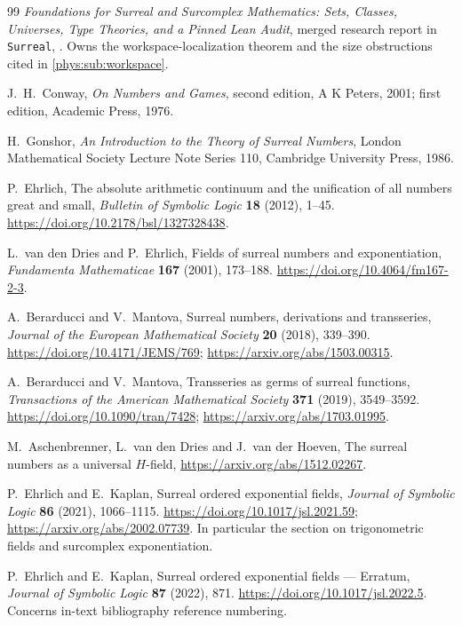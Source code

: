 \documentclass[11pt,letterpaper]{article}
\numberwithin{equation}{section}
\theoremstyle{definition}
\theoremstyle{remark}
\begin{document}
\begin{thebibliography}{99}
\emph{Foundations for Surreal and Surcomplex Mathematics: Sets, Classes,
Universes, Type Theories, and a Pinned Lean Audit}, merged research report in
\texttt{Surreal}, .
Owns the workspace-localization theorem and the size obstructions cited in
\cref{phys:sub:workspace}.

J.~H.~Conway, \emph{On Numbers and Games}, second edition, A K Peters, 2001;
first edition, Academic Press, 1976.

H.~Gonshor, \emph{An Introduction to the Theory of Surreal Numbers}, London
Mathematical Society Lecture Note Series 110, Cambridge University Press, 1986.

P.~Ehrlich, The absolute arithmetic continuum and the unification of all
numbers great and small, \emph{Bulletin of Symbolic Logic} \textbf{18} (2012),
1--45. \url{https://doi.org/10.2178/bsl/1327328438}.

L.~van den Dries and P.~Ehrlich, Fields of surreal numbers and exponentiation,
\emph{Fundamenta Mathematicae} \textbf{167} (2001), 173--188.
\url{https://doi.org/10.4064/fm167-2-3}.

A.~Berarducci and V.~Mantova, Surreal numbers, derivations and transseries,
\emph{Journal of the European Mathematical Society} \textbf{20} (2018),
339--390. \url{https://doi.org/10.4171/JEMS/769};
\url{https://arxiv.org/abs/1503.00315}.

A.~Berarducci and V.~Mantova, Transseries as germs of surreal functions,
\emph{Transactions of the American Mathematical Society} \textbf{371} (2019),
3549--3592. \url{https://doi.org/10.1090/tran/7428};
\url{https://arxiv.org/abs/1703.01995}.

M.~Aschenbrenner, L.~van den Dries and J.~van der Hoeven, The surreal numbers
as a universal $H$-field, \url{https://arxiv.org/abs/1512.02267}.

P.~Ehrlich and E.~Kaplan, Surreal ordered exponential fields, \emph{Journal of
Symbolic Logic} \textbf{86} (2021), 1066--1115.
\url{https://doi.org/10.1017/jsl.2021.59}; \url{https://arxiv.org/abs/2002.07739}.
In particular the section on trigonometric fields and surcomplex
exponentiation.

P.~Ehrlich and E.~Kaplan, Surreal ordered exponential fields --- Erratum,
\emph{Journal of Symbolic Logic} \textbf{87} (2022), 871.
\url{https://doi.org/10.1017/jsl.2022.5}. Concerns in-text bibliography
reference numbering.


\end{thebibliography}
\end{document}
